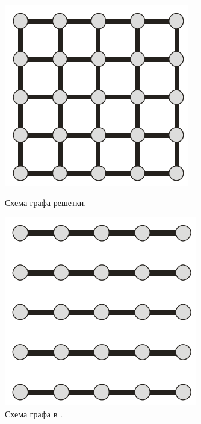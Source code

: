 \documentclass[oneside,final,12pt]{scrartcl}
\begin{document}
			\begin{figure}[h]
				\centering
				\includegraphics[width=0.8\linewidth]{graph_0.png}
				\caption{Схема графа решетки.}
				\label{fig:graph_0}
				\endminipage\hfill
				\centering
				\includegraphics[width=0.8\linewidth]{graph_1.png}
				\caption{Схема графа в \cite{Jung2006}.}
				\label{fig:graph_1}
				\endminipage\hfill
				\centering

\end{figure}
\end{document}
